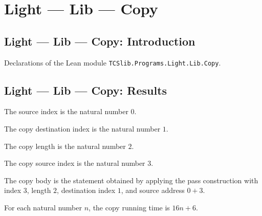 \section{Light --- Lib --- Copy}
\subsection*{Light --- Lib --- Copy: Introduction}

Declarations of the Lean module \texttt{TCSlib.Programs.Light.Lib.Copy}.

\subsection*{Light --- Lib --- Copy: Results}

\begin{definition}
\label{Light.Copy.Src}
\leanok
The source index is the natural number $0$.
\end{definition}

\begin{definition}
\label{Light.Copy.Dst}
\leanok
{}
The copy destination index is the natural number $1$.
\end{definition}

\begin{definition}
\label{Light.Copy.Len}
\leanok
{}
The copy length is the natural number $2$.
\end{definition}

\begin{definition}
\label{Light.Copy.Idx}
\leanok
{}
The copy source index is the natural number $3$.
\end{definition}

\begin{definition}
\label{Light.copyBody}
\leanok
{}
The copy body is the statement obtained by applying the pass construction with index
$3$, length $2$, destination index $1$, and source address $0+3$.
\end{definition}

\begin{definition}
\label{Light.copyTime}
\leanok
For each natural number $n$, the copy running time is $16n+6$.
\end{definition}

